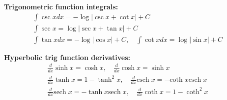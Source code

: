 \documentclass[10pt,landscape]{article}
\makeatletter
\renewcommand{\section}{\@startsection{section}{1}{0mm}%
                                {-1ex}%
                                {0.5ex}%
                                {\normalfont\large\bfseries}}
\makeatother
\begin{document}
\begin{multicols}{3}
\par \textbf{Trigonometric function integrals:}
\begin{gather*}
\int \csc x dx = - \log |\csc x + \cot x| + C \\
\int \sec x = \log |\sec x + \tan x| + C\\
\int \tan x dx = - \log|\cos x| + C, \quad \int \cot x dx = \log | \sin x | + C
\end{gather*}
\par \textbf{Hyperbolic trig function derivatives:}
\begin{gather*}
\frac{d}{dx} \sinh x = \cosh x, \quad \frac{d}{dx}\cosh x = \sinh x\\
\frac{d}{dx}\tanh x = 1 - \tanh^2 x, \quad \frac{d}{dx}\text{csch}\; x = - \text{coth}\;x \text{csch} \;x \\
\frac{d}{dx}\text{sech}\; x = - \tanh x \text{sech}\; x, \quad
\frac{d}{dx}\coth x = 1 - \coth^2 x
\end{gather*}





\end{multicols}
\end{document}
